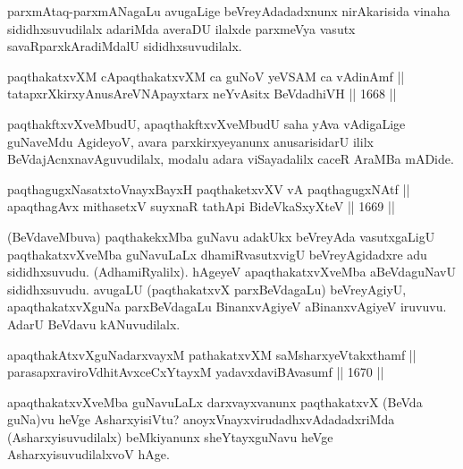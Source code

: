 \begin{artha}
parxmAtaq-parxmANagaLu avugaLige beVreyAdadadxnunx nirAkarisida vinaha sididhxsuvudilalx adariMda averaDU ilalxde parxmeVya vasutx savaRparxkAradiMdalU sididhxsuvudilalx.
\end{artha}


\begin{shl}
paqthakatxvXM cApaqthakatxvXM ca guNoV yeVSAM ca vAdinAmf ||  \\
tatapxrXkirxyAnusAreVNApayxtarx neYvAsitx BeVdadhiVH \hfill || 1668 ||  
\end{shl}

\begin{artha}
paqthakftxvXveMbudU, apaqthakftxvXveMbudU saha yAva vAdigaLige guNaveMdu AgideyoV, avara parxkirxyeyanunx anusarisidarU ililx BeVdajAcnxnavAguvudilalx, modalu adara viSayadalilx caceR AraMBa mADide.
\end{artha}

\begin{shl}
paqthagugxNasatxtoV\s nayxBayxH paqthaketxvXV vA paqthagugxNAtf ||  \\
apaqthagAvx mithasetxV suyxnaR tathA\s pi BideVkaSxyXteV \hfill || 1669 ||  
\end{shl}

\begin{artha}
(BeVdaveMbuva) paqthakekxMba guNavu adakUkx beVreyAda vasutxgaLigU paqthakatxvXveMba guNavuLaLx dhamiRvasutxvigU beVreyAgidadxre adu sididhxsuvudu. (AdhamiRyalilx). hAgeyeV apaqthakatxvXveMba aBeVdaguNavU sididhxsuvudu. avugaLU (paqthakatxvX parxBeVdagaLu) beVreyAgiyU, apaqthakatxvXguNa parxBeVdagaLu BinanxvAgiyeV aBinanxvAgiyeV iruvuvu. AdarU BeVdavu kANuvudilalx.
\end{artha}

\begin{shl}
apaqthakAtxvXguNadarxvayxM pathakatxvXM saMsharxyeVtakxthamf ||  \\
parasapxraviroVdhitAvxceCxYtayxM yadavxdaviBAvasumf \hfill || 1670 ||  
\end{shl}

\begin{artha}
apaqthakatxvXveMba guNavuLaLx darxvayxvanunx paqthakatxvX (BeVda guNa)vu heVge AsharxyisiVtu?  anoyxVnayxvirudadhxvAdadadxriMda (Asharxyisuvudilalx) beMkiyanunx sheYtayxguNavu heVge AsharxyisuvudilalxvoV hAge.
\end{artha}

